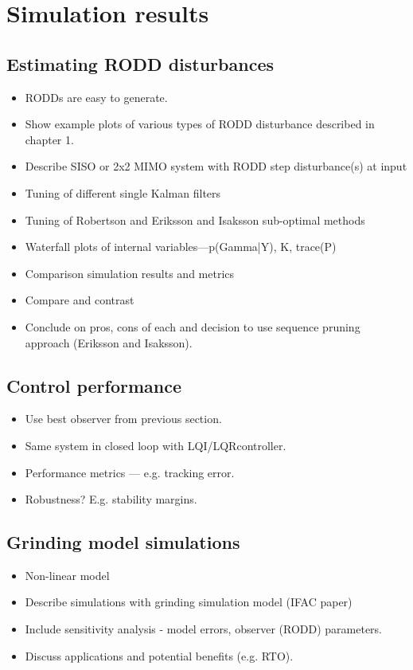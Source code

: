 \chapter{Simulation results}
\label{chap-simulation}

\section{Estimating RODD disturbances}

\begin{itemize}
	\item RODDs are easy to generate.
	\item Show example plots of various types of RODD disturbance described in chapter 1.
	\item Describe SISO or 2x2 MIMO system with RODD step disturbance(s) at input
	\item Tuning of different single Kalman filters
	\item Tuning of Robertson and Eriksson and Isaksson sub-optimal methods
	\item Waterfall plots of internal variables—p(Gamma|Y), K, trace(P)
	\item Comparison simulation results and metrics
	\item Compare and contrast
	\item Conclude on pros, cons of each and decision to use sequence pruning approach (Eriksson and Isaksson).
\end{itemize}

\section{Control performance}

\begin{itemize}
	\item Use best observer from previous section.
	\item Same system in closed loop with LQI/LQRcontroller.
	\item Performance metrics — e.g. tracking error.
	\item Robustness?  E.g. stability margins.
\end{itemize}


\section{Grinding model simulations}

\begin{itemize}
	\item Non-linear model
	\item Describe simulations with grinding simulation model (IFAC paper)
	\item Include sensitivity analysis - model errors, observer (RODD) parameters.
	\item Discuss applications and potential benefits (e.g. RTO).
\end{itemize}

